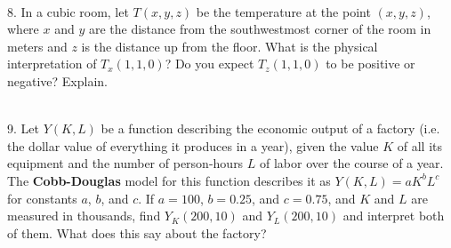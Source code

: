 \documentclass{article}
\begin{document}
~\\

8. In a cubic room, let $T(x, y, z)$ be the temperature at the point $(x, y, z)$, where $x$ and $y$ are the distance from the southwestmost corner of the room in meters and $z$ is the distance up from the floor. What is the physical interpretation of $T_x(1, 1, 0)$? Do you expect $T_z(1, 1, 0)$ to be positive or negative? Explain.

~\\

9. Let $Y(K, L)$ be a function describing the economic output of a factory (i.e. the dollar value of everything it produces in a year), given the value $K$ of all its equipment and the number of person-hours $L$ of labor over the course of a year. The \textbf{Cobb-Douglas} model for this function describes it as $Y(K, L) = aK^bL^c$ for constants $a$, $b$, and $c$. If $a = 100$, $b = 0.25$, and $c = 0.75$, and $K$ and $L$ are measured in thousands, find $Y_K(200, 10)$ and $Y_L(200, 10)$ and interpret both of them. What does this say about the factory?
\end{document}
